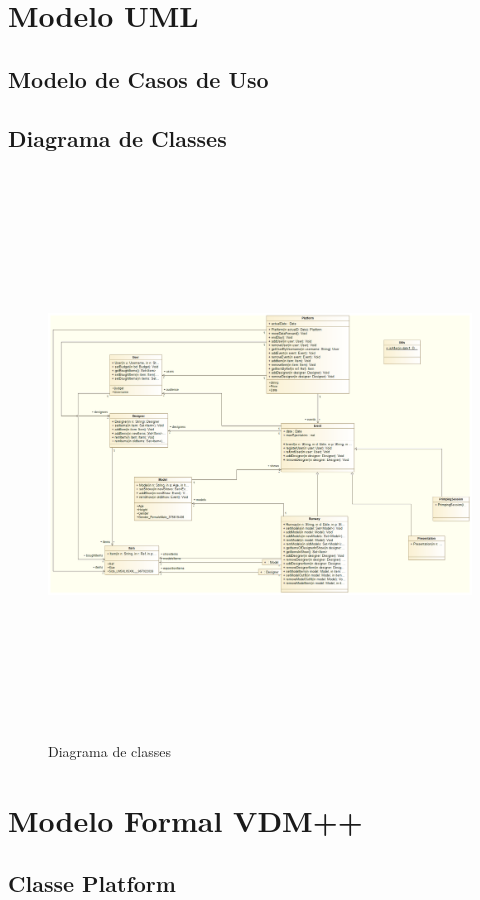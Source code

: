 \documentclass{article}
\begin{document}
\section{Modelo UML}
\subsection{Modelo de Casos de Uso}
\subsection{Diagrama de Classes}
\begin{figure}[H]
\centering
\includegraphics[width=160mm,height=150mm]{./images/class_diagram.png}
\caption{Diagrama de classes}
\label{fig:method}
\end{figure}
		
\section{Modelo Formal VDM++}
\subsection{Classe Platform}
\end{document}

